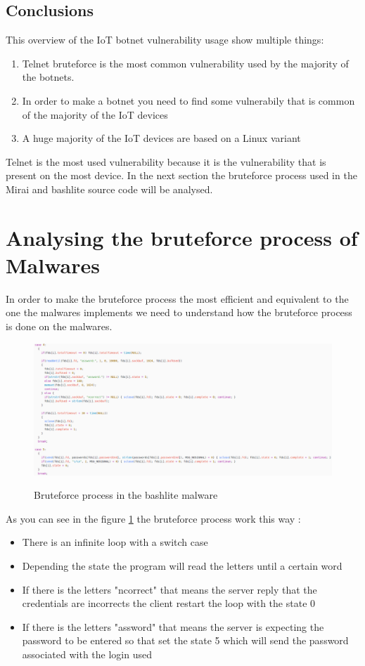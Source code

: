 \documentclass{report}
\begin{document}
\subsection{Conclusions}
This overview of the IoT botnet vulnerability usage show multiple things:
\begin{enumerate}
 \item Telnet bruteforce is the most common vulnerability used by the majority of the botnets.
 \item In order to make a botnet you need to find some vulnerabily that is common of the majority of the IoT devices
 \item A huge majority of the IoT devices are based on a Linux variant
\end{enumerate}
Telnet is the most used vulnerability because it is the vulnerability that is present on the most device. In the next section the bruteforce process used in the Mirai and bashlite source code will be analysed.

\section{Analysing the bruteforce process of Malwares}
In order to make the bruteforce process the most efficient and equivalent to the one the malwares implements we need to understand how the bruteforce process is done on the malwares.
\begin{figure}
 \caption{Bruteforce process in the bashlite malware}
 \includegraphics[width=1.2\textwidth]{./img/bashlite-bruteforce}
 \label{fig:bashlite-brute}
\end{figure}
As you can see in the figure \ref{fig:bashlite-brute} the bruteforce process work this way :
\begin{itemize}
\item There is an infinite loop with a switch case

\item Depending the state the program will read the letters until a certain word

\item If there is the letters "ncorrect" that means the server reply that the credentials are incorrects the client restart the loop with the state 0

\item If there is the letters "assword" that means the server is expecting the password to be entered so that set the state 5 which will send the password associated with the login used
\end{itemize}
\end{document}
